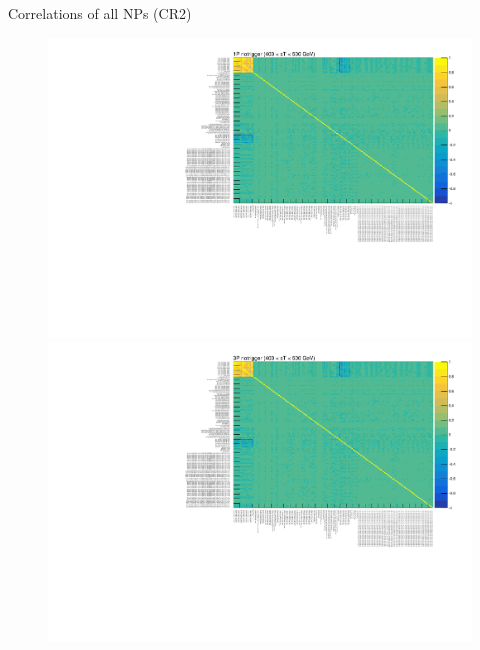\documentclass[aspectratio=46, dvipdfmx, 10pt, t]{beamer} %
\begin{document}
\begin{frame}{Correlations of all NPs (CR2)}
  \vspace{15mm}
  \begin{figure}
    \setcounter{subfigure}{0}
    \centering
        \includegraphics[scale=0.29]{correlation_1P_notrigger_CR2_stGE400LT500}
        \includegraphics[scale=0.29]{correlation_3P_notrigger_CR2_stGE400LT500}
  \end{figure}
\end{frame}
\end{document}
